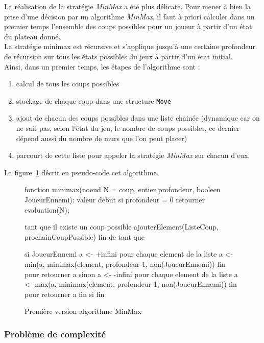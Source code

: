 \documentclass[12pt,a4paper]{article}
\begin{document}
La réalisation de la stratégie \textit{MinMax} a été plus délicate.
Pour mener à bien la prise d'une décision par un algorithme \textit{MinMax}, il faut à 
priori calculer dans un premier temps l'ensemble des coups possibles pour un 
joueur à partir d'un état du plateau donné.\\

La stratégie minimax est récursive et s'applique jusqu'à une certaine 
profondeur de récursion sur tous les états possibles du jeux à partir d'un état 
initial.\\

\noindent Ainsi, dans un premier temps, les étapes de l'algorithme sont :
\begin{enumerate}
  \item calcul de tous les coups possibles
  \item stockage de chaque coup dans une structure \verb,Move,
  \item ajout de chacun des coups possibles dans une liste chainée (dynamique car on ne 
    sait pas, selon l'état du jeu, le nombre de coups possibles, ce dernier dépend 
    aussi du nombre de murs que l'on peut placer)
  \item parcourt de cette liste pour appeler la stratégie \textit{MinMax} sur chacun d'eux.\\
\end{enumerate}

La figure~\ref{algo} décrit en pseudo-code cet algorithme.

\begin{figure}[h]
\begin{verbatimtab}[2]
fonction minimax(noeud N = coup, entier profondeur, booleen JoueurEnnemi): 
valeur
debut
	si profondeur = 0
		retourner evaluation(N);

	tant que il existe un coup possible
		ajouterElement(ListeCoup, prochainCoupPossible)
	fin de tant que
	
	si JoueurEnnemi
		a <- +infini
		pour chaque element de la liste
			a <- min(a, minimax(element, profondeur-1, non(JoueurEnnemi))
		fin pour
		retourner a
	sinon
		a <- -infini
		pour chaque element de la liste
			a <- max(a, minimax(element, profondeur-1, non(JoueurEnnemi))
		fin pour
		retourner a
	fin si
fin
  \end{verbatimtab}
  \caption{Première version algorithme MinMax}
  \label{algo}
\end{figure}

\subsubsection{Problème de complexité}
\end{document}
